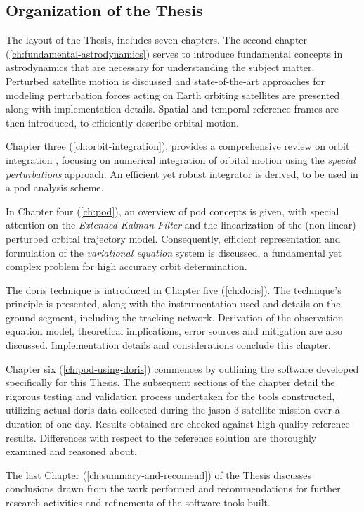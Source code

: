 \subsection{Organization of the Thesis}\label{ssec:organization}
The layout of the Thesis, includes seven chapters.
The second chapter (\autoref{ch:fundamental-astrodynamics}) serves to introduce
fundamental concepts in astrodynamics that are necessary for understanding the subject
matter.
Perturbed satellite motion is discussed and
state-of-the-art approaches for modeling perturbation forces acting on Earth orbiting
satellites are presented along with implementation details. Spatial and temporal reference
frames are then introduced, to efficiently describe orbital motion.

Chapter three (\autoref{ch:orbit-integration}), provides a comprehensive review on orbit integration
, focusing on
numerical integration of orbital motion using the \emph{special perturbations}
approach. An efficient yet robust integrator is derived, to be used in a \gls{pod}
analysis scheme.

In Chapter four (\autoref{ch:pod}), an overview of \gls{pod} concepts is given,
with special attention on the \emph{Extended Kalman Filter} and the linearization
of the (non-linear) perturbed orbital trajectory model. Consequently, efficient
representation and formulation of the \emph{variational equation} system is discussed,
a fundamental yet complex problem for high accuracy orbit determination.

The \gls{doris} technique is introduced in Chapter five (\autoref{ch:doris}).
The technique's principle is presented, along with the instrumentation used and
details on the ground segment, including the tracking network. Derivation of the
observation equation model, theoretical implications, error sources and mitigation are
also discussed. Implementation details and considerations conclude this
chapter.

Chapter six (\autoref{ch:pod-using-doris}) commences by outlining the software developed
specifically for this Thesis. The subsequent sections of the chapter detail the rigorous
testing and validation process undertaken for the tools constructed, utilizing actual \gls{doris}
 data collected during the \gls{jason}-3 satellite mission over a duration of one day.
Results obtained are checked against high-quality
reference results. Differences with respect to the reference solution are thoroughly
examined and reasoned about.

The last Chapter (\autoref{ch:summary-and-recomend}) of the Thesis discusses
conclusions drawn from the work performed and recommendations for further research
activities and refinements of the software tools built.

